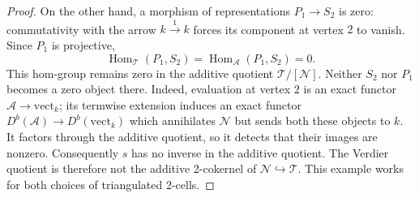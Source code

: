 \documentclass[11pt,reqno,a4paper]{amsart}
\theoremstyle{definition}
\theoremstyle{remark}
\newcommand{\A}{\mathcal{A}}
\newcommand{\N}{\mathcal{N}}
\newcommand{\T}{\mathcal{T}}
\newcommand{\0}{\mathbf{0}}
\renewcommand{\1}{\mathbf{1}}
\newcommand{\aq}[2]{#1/[#2]}
\begin{document}
\begin{proof}
On the other hand, a morphism of representations $P_1\to S_2$ is
zero: commutativity with the arrow $k\xrightarrow{1}k$ forces its
component at vertex $2$ to vanish. Since $P_1$ is projective,
\[
 \operatorname{Hom}_{\T}(P_1,S_2)
 =\operatorname{Hom}_{\A}(P_1,S_2)=0.
\]
This hom-group remains zero in the additive quotient $\aq{\T}{\N}$.
Neither $S_2$ nor $P_1$ becomes a zero object there. Indeed, evaluation
at vertex $2$ is an exact functor $\A\to\mathrm{vect}_k$; its
termwise extension induces an exact functor
$D^b(\A)\to D^b(\mathrm{vect}_k)$ which annihilates $\N$ but sends
both these objects to $k$. It factors through the additive quotient,
so it detects that their images are nonzero. Consequently $s$ has no
inverse in the additive quotient. The Verdier quotient is therefore
not the additive 2-cokernel of $\N\hookrightarrow\T$. This example
works for both choices of triangulated 2-cells.
\end{proof}
\end{document}
